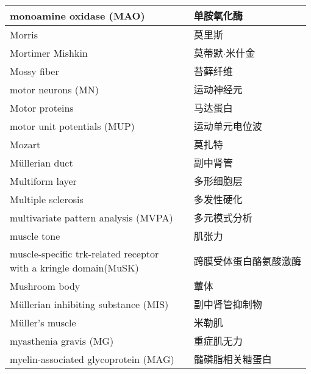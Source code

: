 \begin{longtable}{lll}
	\midrule
	monoamine oxidase (MAO)   && 单胺氧化酶  \\
	
	\midrule
	Morris   && 莫里斯  \\
	
	\midrule
	Mortimer Mishkin   && 莫蒂默$\cdot$米什金  \\
	
	\midrule
	Mossy fiber   && 苔藓纤维  \\
	
	\midrule
	motor neurons (MN)   && 运动神经元  \\
	
	\midrule
	Motor proteins   && 马达蛋白  \\
	
	\midrule
	motor unit potentials (MUP)  && 运动单元电位波  \\
	
	\midrule
	Mozart  && 莫扎特  \\
	
	\midrule
	Müllerian duct   && 副中肾管  \\
	
	\midrule
	Multiform layer   && 多形细胞层  \\
	
	\midrule
	Multiple sclerosis   && 多发性硬化  \\
	
	\midrule
	multivariate pattern analysis (MVPA)  && 多元模式分析  \\
	
	\midrule
	muscle tone   && 肌张力  \\
	
	\midrule
	\makecell[l]{muscle-specific trk-related receptor \\with a kringle domain(MuSK)}   && 跨膜受体蛋白酪氨酸激酶  \\
	
	\midrule
	Mushroom body   && 蕈体  \\
	
	\midrule
	Müllerian inhibiting substance (MIS)   && 副中肾管抑制物  \\
	
	\midrule
	Müller's muscle   && 米勒肌  \\
	
	\midrule
	myasthenia gravis (MG)    && 重症肌无力   \\
	
	\midrule
	myelin-associated glycoprotein (MAG)     && 髓磷脂相关糖蛋白   \\
	

\end{longtable}
